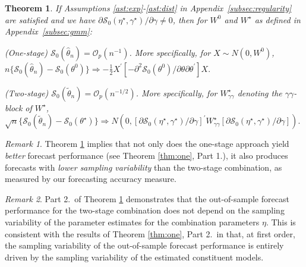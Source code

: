 \documentclass[12pt]{article}
\newtheorem{theorem}{Theorem}
\theoremstyle{definition}
\theoremstyle{remark}
\newtheorem{remark}{Remark}
\renewcommand{\appendixname}{Appendix}
\begin{document}
\begin{theorem}
\label{thm:two} If Assumptions \ref{ast:exp}-\ref{ast:dist} in \appendixname\ \ref{subsec:regularity} are satisfied and we have $\partial \mathcal{S}_0(\eta^{\star}, \gamma^{\star}) / \partial \gamma\allowbreak \ne 0$, then for $W^0$ and $W^{\star}$ as defined in \appendixname\ \ref{subsec:gmm}:

\smallskip

\noindent(One-stage) $\mathcal{S}_0(\hat{\theta}_n) = \mathcal{O}_p(n^{-1})$. More specifically, for $X\sim N(0, W^0)$, \\ $n \lbrace \mathcal{S}_0(\hat{\theta}_{n}) - \mathcal{S}_0(\theta^0) \rbrace \Rightarrow - \frac{1}{2} X^{\prime} \left[ - \partial^2 \mathcal{S}_{0}(\theta^0) / \partial \theta \partial \theta^{\prime} \right] X.$

\smallskip

\noindent(Two-stage) $\mathcal{S}_0(\tilde{\theta}_n) = \mathcal{O}_p(n^{-1/2}) $. More specifically, for $W^\star_{\gamma\gamma}$ denoting the $\gamma\gamma$-block of $W^\star$, \\ $\sqrt{n} \lbrace \mathcal{S}_0(\tilde{\theta}_{n}) - \mathcal{S}_{0}(\theta^{\star}) \rbrace \Rightarrow N(0, [\partial \mathcal{S}_{0}(\eta^{\star}, \gamma^{\star}) / \partial \gamma]^{\prime} W^{\star}_{\gamma \gamma} [\partial \mathcal{S}_0(\eta^{\star}, \gamma^{\star}) / \partial \gamma]).$

\end{theorem}

\begin{remark}
\label{rmk:rateofconvergence} Theorem \ref{thm:two} implies that not only does the one-stage approach yield \textit{better} forecast performance (see Theorem \ref{thm:one}, Part 1.), it also produces forecasts with \textit{lower sampling variability} than the two-stage combination, as measured by our forecasting accuracy measure.
\end{remark}

\begin{remark}
Part 2.\ of Theorem \ref{thm:two} demonstrates that the out-of-sample forecast performance for the two-stage combination does not depend on the sampling variability of the parameter estimates for the combination parameters $\eta $. This is consistent with the results of Theorem \ref{thm:one}, Part 2.\ in that, at first order, the sampling variability of the out-of-sample forecast performance is entirely driven by the sampling variability of the estimated constituent models.
\end{remark}
\end{document}
